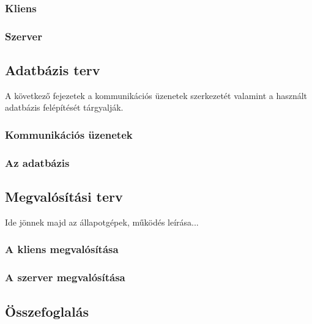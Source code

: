 \subsubsection{Kliens}
\label{sec:kliensinterfesz}

\subsubsection{Szerver}
\label{sec:szerverinterfesz}

\subsection{Adatbázis terv}

A következő fejezetek a kommunikációs üzenetek szerkezetét valamint a használt adatbázis felépítését tárgyalják.


\subsubsection{Kommunikációs üzenetek}
\label{sec:kommuzenetek}

\subsubsection{Az adatbázis}
\label{sec:adatb}

\subsection{Megvalósítási terv}
\label{sec:megvalositas}

Ide jönnek majd az állapotgépek, működés leírása...

\subsubsection{A kliens megvalósítása}
\label{sec:kliensmegvalositas}

\subsubsection{A szerver megvalósítása}
\label{sec:szervermegvalositas}


\subsection{Összefoglalás}

